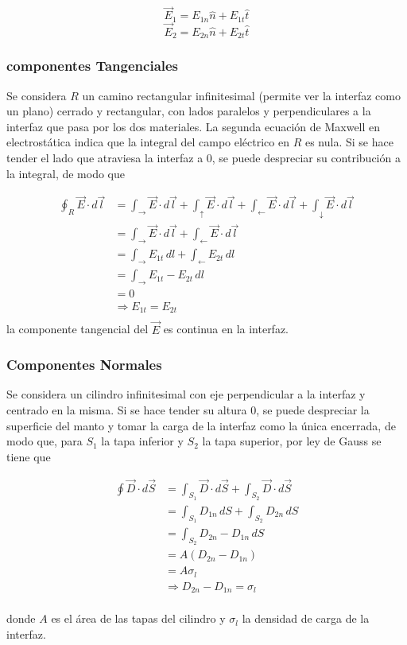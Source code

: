 \[\Vec{E}_1 = E_{1n}\hat{n}+E_{1t}\hat{t}\]
\[\Vec{E}_2 = E_{2n}\hat{n}+E_{2t}\hat{t}\]

\subsubsection{componentes Tangenciales}

Se considera $R$ un camino rectangular infinitesimal (permite ver la interfaz como un plano) cerrado y rectangular, con lados paralelos y perpendiculares a la interfaz que pasa por los dos materiales. La segunda ecuación de Maxwell en electrostática indica que la integral del campo eléctrico en $R$ es nula. Si se hace tender el lado que atraviesa la interfaz a 0, se puede despreciar su contribución a la integral, de modo que


\begin{equation}
\begin{split}
    \oint_R\Vec{E}\cdot d\Vec{l} &= 
    \int_\rightarrow\Vec{E}\cdot d\Vec{l}+
    \int_\uparrow \Vec{E}\cdot d\Vec{l}+
    \int_\leftarrow \Vec{E}\cdot d\Vec{l}+
    \int_\downarrow \Vec{E}\cdot d\Vec{l}\\
    &= \int_\rightarrow\Vec{E}\cdot d\Vec{l}+
    \int_\leftarrow\Vec{E}\cdot d\Vec{l}\\
    &= \int_\rightarrow E_{1t}\,dl+
    \int_\leftarrow E_{2t}\, dl\\
    &= \int_\rightarrow E_{1t}-E_{2t}\, dl\\
    &= 0\\
    &\Rightarrow E_{1t}=E_{2t}\\
\end{split}
\nonumber
\end{equation}
\bigbreak
la componente tangencial del $\Vec{E}$ es continua en la interfaz.
\subsubsection{Componentes Normales}

Se considera un cilindro infinitesimal con eje perpendicular a la interfaz y centrado en la misma. Si se hace tender su altura 0, se puede despreciar la superficie del manto y tomar la carga de la interfaz como la única encerrada, de modo que, para $S_1$ la tapa inferior y $S_2$ la tapa superior, por ley de Gauss se tiene que

\begin{equation}
\begin{split}
    \oint\Vec{D}\cdot d\Vec{S}&=\int_{S_1}\Vec{D}\cdot d\Vec{S}+\int_{S_2}\Vec{D}\cdot d\Vec{S}\\
    &=\int_{S_1}D_{1n}\,dS+\int_{S_2}D_{2n}\,dS\\
    &=\int_{S_2}D_{2n}-D_{1n}\,dS\\
    &=A(D_{2n}-D_{1n})\\
    &=A\sigma_l\\
    &\Rightarrow D_{2n}-D_{1n} = \sigma_l\\
\end{split}
\nonumber
\end{equation}
\bigbreak

donde $A$ es el área de las tapas del cilindro y $\sigma_l$ la densidad de carga de la interfaz.


\newpage